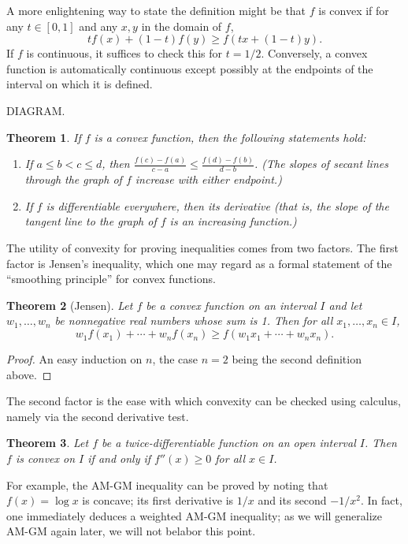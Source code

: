 \documentclass[12pt]{report}
\newtheorem{theorem}{Theorem}
\def\ii{\item}
\newcounter{exc}
\numberwithin{exc}{section}
\begin{document}
A more enlightening way to state the definition might be that $f$ is
convex if for any $t \in [0,1]$ and any $x,y$ in the domain of $f$,
\[
tf(x) + (1-t)f(y) \geq f(tx + (1-t)y).
\]
If $f$ is continuous, it suffices to check this for $t=1/2$. Conversely,
a convex function is automatically continuous except possibly at
the endpoints of the interval on which it is defined.

DIAGRAM.

\begin{theorem}
If $f$ is a convex function, then the following statements hold:
\begin{enumerate}
\ii
If $a \leq b < c \leq d$, then $\frac{f(c)-f(a)}{c-a} \leq 
\frac{f(d)-f(b)}{d-b}$. (The slopes of secant lines through the
graph of $f$ increase with 
either endpoint.)
\ii
If $f$ is differentiable everywhere, then its derivative (that is,
the slope of the tangent line to the graph of $f$ is an
increasing function.)
\end{enumerate}
\end{theorem}

The utility of convexity for proving inequalities comes from two 
factors. The first factor is Jensen's inequality, which one may regard as 
a formal statement of the ``smoothing principle'' for convex functions.
\begin{theorem}[Jensen]
Let $f$ be a convex function on an interval $I$ and let $w_{1}, 
\dots, w_{n}$ be nonnegative real numbers whose sum is 1. Then for all 
$x_{1}, \dots, x_{n} \in I$,
\[
w_{1}f(x_{1}) + \cdots + w_{n} f(x_{n}) \geq f(w_{1}x_{1} + \cdots + 
w_{n}x_{n}).
\]
\end{theorem}
\begin{proof}
An easy induction on $n$, the case $n=2$ being the second definition
above.
\end{proof}

The second factor is the ease with which convexity can be checked 
using calculus, namely via the second derivative test.
\begin{theorem}
Let $f$ be a twice-differentiable function on an open interval $I$. 
Then $f$ is convex on $I$ if and only if $f''(x) \geq 0$ for all $x \in I$.
\end{theorem}
For example, the AM-GM inequality can be proved by noting that 
$f(x) = \log x$ is concave; its first derivative is $1/x$ and its 
second $-1/x^{2}$. In fact, one immediately deduces a weighted AM-GM 
inequality; as we will generalize AM-GM again later, we will not 
belabor this point.
\end{document}
